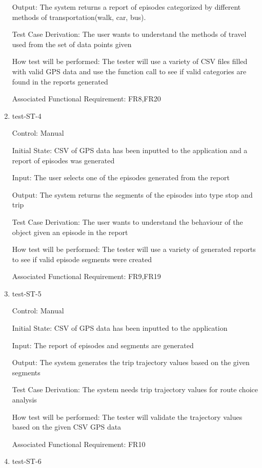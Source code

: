 \documentclass[12pt, titlepage]{article}
\begin{document}
\begin{enumerate}
Output: The system returns a report of episodes categorized by different  methods of transportation(walk, car, bus).

Test Case Derivation: The user wants to understand the methods of travel used from the set of data points given

How test will be performed: The tester will use a variety of CSV files filled with valid GPS data and use the function call to see if valid categories are found in the reports generated


Associated Functional Requirement: FR8,FR20


\item{test-ST-4\\}

Control: Manual
					
Initial State: CSV of GPS data has been inputted to the application and a report of episodes was generated 
					
Input: The user selects one of the episodes generated from the report
					
Output: The system returns the segments of the episodes into type stop and trip 

Test Case Derivation: The user wants to understand the behaviour of the object given an episode in the report

How test will be performed: The tester will use a variety of generated reports to see if valid episode segments were created 


Associated Functional Requirement: FR9,FR19


\item{test-ST-5\\}

Control: Manual
					
Initial State: CSV of GPS data has been inputted to the application 
					
Input: The report of episodes and segments are generated
					
Output: The system generates the trip trajectory values based on the given segments

Test Case Derivation: The system needs trip trajectory values for route choice analysis

How test will be performed: The tester will validate the trajectory values based on the given CSV GPS data 

Associated Functional Requirement: FR10

\item{test-ST-6\\}


\end{enumerate}
\end{document}
